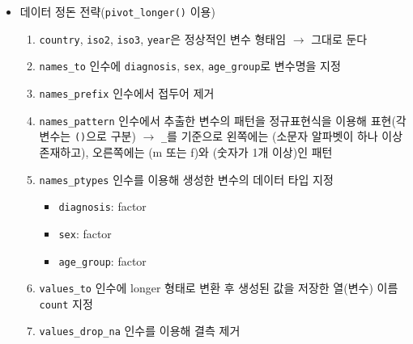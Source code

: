 \documentclass[
  11pt,
]{krantz}
\providecommand{\tightlist}{%
  \setlength{\itemsep}{0pt}\setlength{\parskip}{0pt}}
\begin{document}
\begin{itemize}
\tightlist
\item
  데이터 정돈 전략(\texttt{pivot\_longer()} 이용)

  \begin{enumerate}
  \def\labelenumi{\arabic{enumi}.}
  \tightlist
  \item
    \texttt{country}, \texttt{iso2}, \texttt{iso3}, \texttt{year}은 정상적인 변수 형태임 \(\rightarrow\) 그대로 둔다
  \item
    \texttt{names\_to} 인수에 \texttt{diagnosis}, \texttt{sex}, \texttt{age\_group}로 변수명을 지정
  \item
    \texttt{names\_prefix} 인수에서 접두어 제거
  \item
    \texttt{names\_pattern} 인수에서 추출한 변수의 패턴을 정규표현식을 이용해 표현(각 변수는 \texttt{()}으로 구분) \(\rightarrow\) \texttt{\_}를 기준으로 왼쪽에는 (소문자 알파벳이 하나 이상 존재하고), 오른쪽에는 (m 또는 f)와 (숫자가 1개 이상)인 패턴
  \item
    \texttt{names\_ptypes} 인수를 이용해 생성한 변수의 데이터 타입 지정

    \begin{itemize}
    \tightlist
    \item
      \texttt{diagnosis}: factor
    \item
      \texttt{sex}: factor
    \item
      \texttt{age\_group}: factor
    \end{itemize}
  \item
    \texttt{values\_to} 인수에 longer 형태로 변환 후 생성된 값을 저장한 열(변수) 이름 \texttt{count} 지정
  \item
    \texttt{values\_drop\_na} 인수를 이용해 결측 제거
  \end{enumerate}
\end{itemize}

\footnotesize
\end{document}
